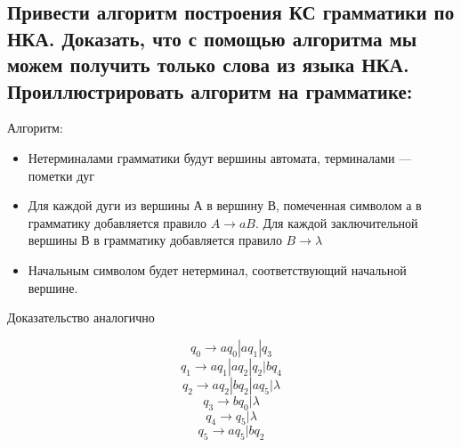 \documentclass[a4paper,12pt]{article}
\begin{document}
\subsection{ Привести алгоритм построения КС грамматики по НКА. Доказать, что с помощью алгоритма мы можем получить только слова из языка НКА. Проиллюстрировать алгоритм на грамматике:}


{Алгоритм: }
\begin{itemize}
 \item {
    Нетерминалами  грамматики  будут  вершины  автомата, терминалами — пометки дуг
 }
 \item {
    Для  каждой дуги  из  вершины А в  вершину В,  помеченная  символом а в грамматику  добавляется правило $A \rightarrow aB$. Для каждой заключительной вершины В в грамматику добавляется правило $B \rightarrow \lambda$
 }
 
 \item {
Начальным  символом  будет  нетерминал,  соответствующий начальной  вершине.
 }
 
\end{itemize}

{Доказательство аналогично}

$$ q_0 \rightarrow aq_0 | aq_1 | q_3 $$
$$ q_1 \rightarrow aq_1 | aq_2 | q_2 | bq_4 $$
$$ q_2 \rightarrow aq_2 | bq_2 | aq_5 | \lambda$$
$$ q_3 \rightarrow bq_0 | \lambda$$
$$ q_4 \rightarrow q_5 | \lambda$$
$$ q_5 \rightarrow aq_5 | bq_2$$
$$ $$
$$ $$
\end{document}
